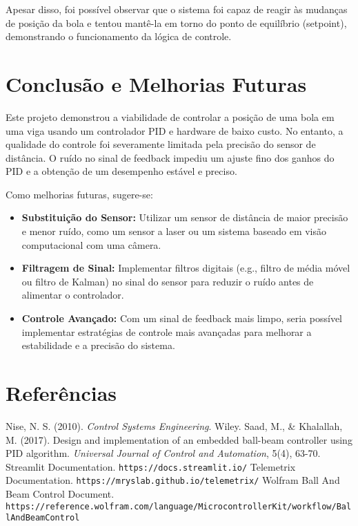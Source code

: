 \documentclass[a4paper, 11pt]{article}
\begin{document}
Apesar disso, foi possível observar que o sistema foi capaz de reagir às mudanças de posição da bola e tentou mantê-la em torno do ponto de equilíbrio (setpoint), demonstrando o funcionamento da lógica de controle.

\section{Conclusão e Melhorias Futuras}
Este projeto demonstrou a viabilidade de controlar a posição de uma bola em uma viga usando um controlador PID e hardware de baixo custo. No entanto, a qualidade do controle foi severamente limitada pela precisão do sensor de distância. O ruído no sinal de feedback impediu um ajuste fino dos ganhos do PID e a obtenção de um desempenho estável e preciso.

Como melhorias futuras, sugere-se:
\begin{itemize}
    \item \textbf{Substituição do Sensor:} Utilizar um sensor de distância de maior precisão e menor ruído, como um sensor a laser ou um sistema baseado em visão computacional com uma câmera.
    \item \textbf{Filtragem de Sinal:} Implementar filtros digitais (e.g., filtro de média móvel ou filtro de Kalman) no sinal do sensor para reduzir o ruído antes de alimentar o controlador.
    \item \textbf{Controle Avançado:} Com um sinal de feedback mais limpo, seria possível implementar estratégias de controle mais avançadas para melhorar a estabilidade e a precisão do sistema.
\end{itemize}

\section{Referências}
\begin{thebibliography}{9}
     Nise, N. S. (2010). \textit{Control Systems Engineering}. Wiley.
     Saad, M., & Khalallah, M. (2017). Design and implementation of an embedded ball-beam controller using PID algorithm. \textit{Universal Journal of Control and Automation}, 5(4), 63-70.
     Streamlit Documentation. \texttt{https://docs.streamlit.io/}
     Telemetrix Documentation. \texttt{https://mryslab.github.io/telemetrix/}
     Wolfram Ball And Beam Control Document. \texttt{https://reference.wolfram.com/language/MicrocontrollerKit/workflow/BallAndBeamControl}
\end{thebibliography}
\end{document}
